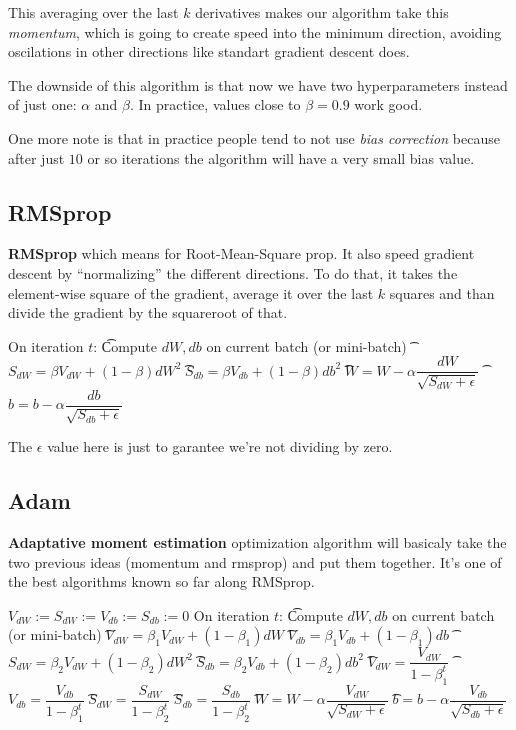 \documentclass[12pt, a4paper, oneside]{book}
\begin{document}
This averaging over the last $k$ derivatives makes our algorithm take this
\textit{momentum}, which is going to create speed into the minimum direction,
avoiding oscilations in other directions like standart gradient descent does.

The downside of this algorithm is that now we have two hyperparameters instead
of just one: $\alpha$ and $\beta$. In practice, values close to $\beta=0.9$ work
good.

One more note is that in practice people tend to not use \textit{bias
correction} because after just $10$ or so iterations the algorithm will have a
very small bias value.

\subsection{RMSprop}%
\label{sub:rmsprop}

\textbf{RMSprop} which means for Root-Mean-Square prop. It also speed gradient
descent by ``normalizing'' the different directions. To do that, it takes the
element-wise square of the gradient, average it over the last $k$ squares and
than divide the gradient by the squareroot of that.

\begin{algorithm}[RMSprop]
On iteration $t$: \nl
\t Compute $dW, db$ on current batch (or mini-batch) \nl
\t $S_{dW}=\beta V_{dW} + (1-\beta)dW^2$ \nl
\t $S_{db}=\beta V_{db} + (1-\beta)db^2$ \nl
\t $W=W-\alpha \dfrac{dW}{\sqrt{S_{dW}+\epsilon}}$ \nl
\t $b=b-\alpha \dfrac{db}{\sqrt{S_{db}+\epsilon}}$ \nl
\end{algorithm}

The $\epsilon$ value here is just to garantee we're not dividing by zero.

\subsection{Adam}%
\label{sub:adam}

\textbf{Adaptative moment estimation} optimization algorithm will basicaly take
the two previous ideas (momentum and rmsprop) and put them together. It's one of
the best algorithms known so far along RMSprop.

\begin{algorithm}[Adam]
$V_{dW}:=S_{dW}:=V_{db}:=S_{db}:=0$ \nl
On iteration $t$: \nl
\t Compute $dW, db$ on current batch (or mini-batch) \nl
\t $V_{dW}=\beta_1 V_{dW} + (1-\beta_1)dW$ \nl
\t $V_{db}=\beta_1 V_{db} + (1-\beta_1)db$ \nl
\t $S_{dW}=\beta_2 V_{dW} + (1-\beta_2)dW^2$ \nl
\t $S_{db}=\beta_2 V_{db} + (1-\beta_2)db^2$ \nl
\t $V_{dW} = \dfrac{V_{dW}}{1-\beta_1^{t}}$ \nl
\t $V_{db} = \dfrac{V_{db}}{1-\beta_1^{t}}$ \nl
\t $S_{dW} = \dfrac{S_{dW}}{1-\beta_2^{t}}$ \nl
\t $S_{db} = \dfrac{S_{db}}{1-\beta_2^{t}}$ \nl
\t $W=W-\alpha \dfrac{V_{dW}}{\sqrt{S_{dW}+\epsilon}}$ \nl
\t $b=b-\alpha \dfrac{V_{db}}{\sqrt{S_{db}+\epsilon}}$ \nl
\end{algorithm}
\end{document}
